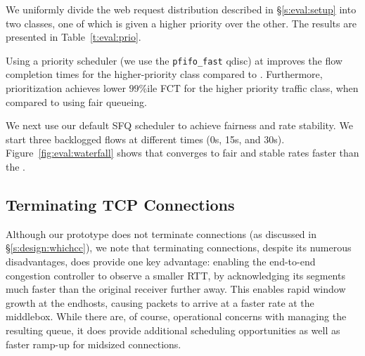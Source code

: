 \label{s:eval:strictprio}
We uniformly divide the web request distribution described in \S\ref{s:eval:setup} into two classes, one of which is given a higher priority over the other. The results are presented in Table~\ref{t:eval:prio}.

Using a priority scheduler (we use the \texttt{pfifo\_fast} qdisc) at \inbox improves the flow completion times for the higher-priority class compared to \baseline.
Furthermore, prioritization achieves \strictPrioTailImprovementOverFq lower $99$\%ile FCT for the higher priority traffic class, when compared to using fair queueing.


\label{s:eval:waterfall}
We next use our default SFQ scheduler to achieve fairness and rate stability. We start three backlogged flows at different times (0s, 15s, and 30s). Figure~\ref{fig:eval:waterfall} shows that \name converges to fair and stable rates faster than the \baseline.


\subsection{Terminating TCP Connections}\label{s:eval:proxy}

Although our \name prototype does not terminate connections (as discussed in \S\ref{s:design:whichcc}), we note that terminating connections, despite its numerous disadvantages, does provide one key advantage: enabling the end-to-end congestion controller to observe a smaller RTT, by acknowledging its segments much faster than the original receiver further away. 
This enables rapid window growth at the endhosts, causing packets to arrive at a faster rate at the middlebox.
While there are, of course, operational concerns with managing the resulting queue, it does provide additional scheduling opportunities as well as faster ramp-up for midsized connections.

